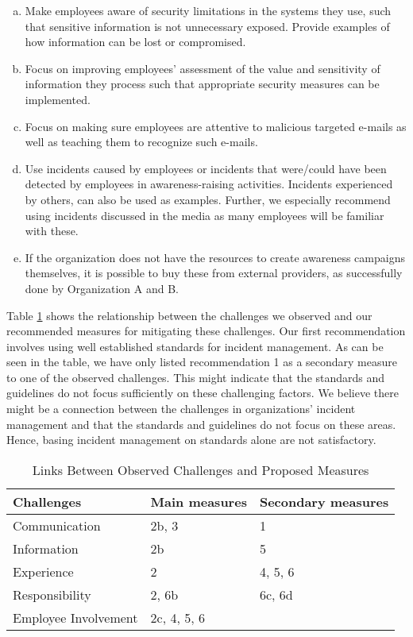 \begin{enumerate}
\begin{enumerate}[a)]
\item Make employees aware of security limitations in the systems they use, such that sensitive information is not unnecessary exposed. Provide examples of how information can be lost or compromised.
\item Focus on improving employees' assessment of the value and sensitivity of information they process such that appropriate security measures can be implemented. 
\item Focus on making sure employees are attentive to malicious targeted e-mails as well as teaching them to recognize such e-mails.
\item Use incidents caused by employees or incidents that were/could have been detected by employees in awareness-raising activities. Incidents experienced by others, can also be used as examples. Further, we especially recommend using incidents discussed in the media as many employees will be familiar with these. 
\item If the organization does not have the resources to create awareness campaigns themselves, it is possible to buy these from external providers, as successfully done by Organization A and B.
\end{enumerate}
\end{enumerate}

Table \ref{tab:challengesAndMeasures} shows the relationship between the challenges we observed and our recommended measures for mitigating these challenges. Our first recommendation involves using well established standards for incident management. As can be seen in the table, we have only listed recommendation 1 as a secondary measure to one of the observed challenges. This might indicate that the standards and guidelines do not focus sufficiently on these challenging factors. We believe there might be a connection between the challenges in organizations' incident management and that the standards and guidelines do not focus on these areas. Hence, basing incident management on standards alone are not satisfactory.

\begin{table}[H]
\begin{center}
\begin{tabular}{| l | l | l |}
\hline
  \textbf{Challenges} & \textbf{Main measures} & \textbf{Secondary measures} \\
  \hline
  Communication & 2b, 3 & 1 \\
  \hline
  Information & 2b & 5 \\
  \hline
  Experience & 2 & 4, 5, 6 \\
  \hline
  Responsibility & 2, 6b & 6c, 6d \\
  \hline
  Employee Involvement & 2c, 4, 5, 6 &  \\
\hline
\end{tabular}
\label{tab:challengesAndMeasures}
\caption{Links Between Observed Challenges and Proposed Measures}
\end{center}
\end{table}

